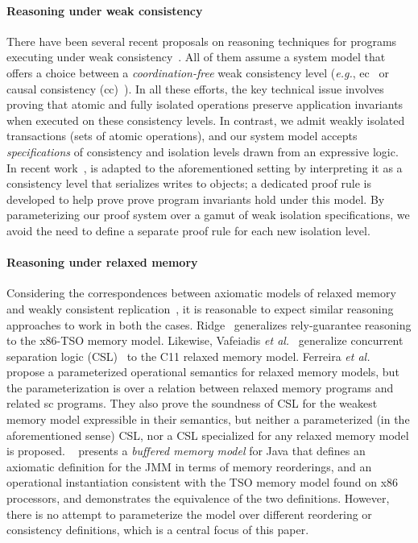 \paragraph{Reasoning under weak consistency} There have been several
recent proposals on reasoning techniques for programs executing under
weak consistency~\cite{bailisvldb, alvarocalm,
  gotsmanpopl16,redblueatc, redblueosdi, ecinec}. All of them assume a
system model that offers a choice between a \emph{coordination-free}
weak consistency level (\emph{e.g.}, {\sc ec}~\cite{redblueosdi,
  redblueatc, ecinec, alvarocalm, bailisvldb} or causal consistency
({\sc cc})~\cite{gotsmanpopl16}). In all these efforts, the key
technical issue involves proving that atomic and fully isolated
operations preserve application invariants when executed on these
consistency levels.  In contrast, we admit weakly isolated
transactions (sets of atomic operations), and our system model accepts
\emph{specifications} of consistency and isolation levels drawn from
an expressive logic.  In recent work~\cite{gotsmanpopl16},
 is adapted to the aforementioned
setting by interpreting it as a consistency level that serializes
writes to objects; a dedicated proof rule is developed to help prove
prove program invariants hold under this model. By parameterizing our
proof system over a gamut of weak isolation specifications, we avoid
the need to define a separate proof rule for each new isolation level.

\paragraph{Reasoning under relaxed memory} Considering the
correspondences between axiomatic models of relaxed
memory~\cite{battycpp} and weakly consistent
replication~\cite{burckhardt14}, it is reasonable to expect similar
reasoning approaches to work in both the cases. Ridge~\cite{rgtso}
generalizes rely-guarantee reasoning to the x86-TSO memory model.
Likewise, Vafeiadis \emph{et al.}~\cite{rsl13} generalize concurrent
separation logic (CSL)~\cite{csl} to the C11 relaxed memory model.
Ferreira \emph{et al.}~\cite{ferreira10} propose a parameterized
operational semantics for relaxed memory models, but the
parameterization is over a relation between relaxed memory programs
and related {\sc sc} programs. They also prove the soundness of CSL
for the weakest memory model expressible in their semantics, but
neither a parameterized (in the aforementioned sense) CSL, nor a CSL
specialized for any relaxed memory model is proposed.  ~\cite{DLZ+13}
presents a \emph{buffered memory model} for Java that defines an
axiomatic definition for the JMM in terms of memory reorderings, and
an operational instantiation consistent with the TSO memory model
found on x86 processors, and demonstrates the equivalence of the two
definitions.  However, there is no attempt to parameterize the model
over different reordering or consistency definitions, which is a central
focus of this paper.

